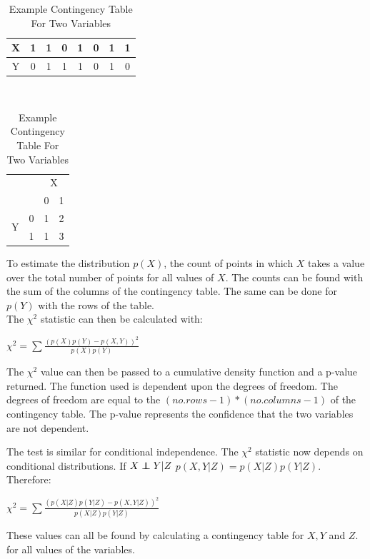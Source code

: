 \documentclass{UoYCSproject}
\newcommand\independent{\protect\mathpalette{\protect\independenT}{\perp}}
\def\independenT#1#2{\mathrel{\rlap{$#1#2$}\mkern2mu{#1#2}}}
\begin{document}
\begin{table}[h!]
	\centering
	\begin{tabular}{c|c c c c c c c}
		X & 1 & 1 & 0 & 1 & 0 & 1 & 1\\ \hline
		Y & 0 & 1 & 1 & 1 & 0 & 1 & 0\\
	\end{tabular}
\\
	\begin{tabular}{c|c|cc|}
		\multicolumn{2}{c}{}& \multicolumn{2}{c}{X} \\ \cline{3-4}
		\multicolumn{2}{c|}{} & 0 & 1 \\ \cline{2-4}
		\multirow{2}{*}{Y} & 0 & 1 & 2\\
		& 1 & 1 & 3 \\
		\cline{2-4} 
	\end{tabular}
\caption{Example Contingency Table For Two Variables}
\end{table}

To estimate the distribution $p(X)$, the count of points in which $X$ takes a value over the total number of points for all values of $X$. The counts can be found with the sum of the columns of the contingency table. The same can be done for $p(Y)$ with the rows of the table.\\

The $\chi^2$ statistic can then be calculated with:

\begin{center}
	$\chi^2 = \sum\frac{(p(X)p(Y)-p(X,Y))^2}{p(X)p(Y)}$
\end{center}

The $\chi^2$ value can then be passed to a cumulative density function and a p-value returned. The function used is dependent upon the degrees of freedom. The degrees of freedom are equal to the $(no. rows -1)*(no. columns -1)$ of the contingency table. The p-value represents the confidence that the two variables are not dependent.

The test is similar for conditional independence. The $\chi^2$ statistic now depends on conditional distributions. If $X \independent Y | Z$ $p(X,Y|Z) = p(X|Z)p(Y|Z)$. Therefore:

\begin{center}
	$\chi^2 = \sum\frac{(p(X|Z)p(Y|Z)-p(X,Y|Z))^2}{p(X|Z)p(Y|Z)}$
\end{center}

These values can all be found by calculating a contingency table for $X,Y $ and $ Z$. for all values of the variables.
\end{document}
